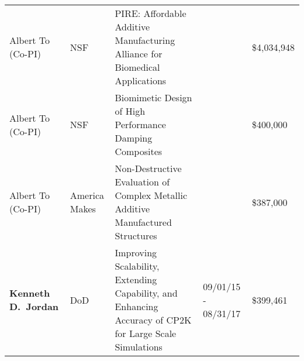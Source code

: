 \begin{tabularx}{\textwidth}{@{}L{1.25in}L{72pt}XR{48pt}R{50pt}@{}}
Albert To (Co-PI) & NSF & PIRE: Affordable Additive Manufacturing
Alliance for Biomedical Applications & & \$4,034,948 \\

Albert To (Co-PI) & NSF & Biomimetic Design of High Performance
Damping Composites & & \$400,000 \\

Albert To (Co-PI) & America Makes & Non-Destructive Evaluation of
Complex Metallic Additive Manufactured Structures & & \$387,000 \\

\textbf{Kenneth D.\ Jordan} & DoD & Improving Scalability, Extending Capability, and Enhancing Accuracy of
CP2K for Large Scale Simulations & 09/01/15 - 08/31/17 & \$399,461 \\



\end{tabularx}
\bigskip

